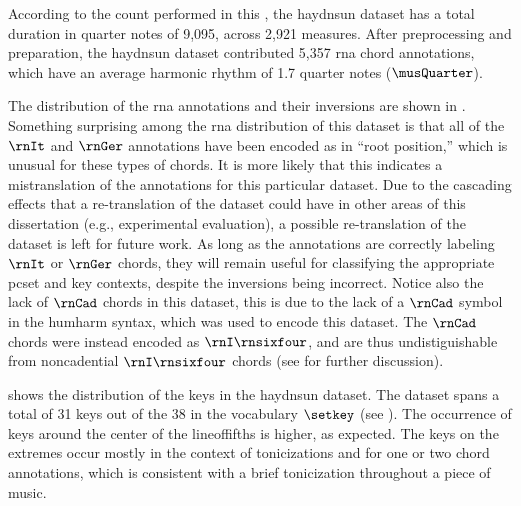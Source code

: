 
According to the count performed in this \thesisdiss{}, the
\gls{haydnsun} dataset has a total duration in quarter notes
of 9,095, across 2,921 measures. After preprocessing and
preparation, the \gls{haydnsun} dataset contributed 5,357
\gls{rna} chord annotations, which have an average harmonic
rhythm of 1.7 quarter notes ($\musQuarter$).

The distribution of the \gls{rna} annotations and their
inversions are shown in .
Something surprising among the \gls{rna} distribution of
this dataset is that all of the $\rnIt$ and $\rnGer$
annotations have been encoded as in ``root position,'' which
is unusual for these types of chords. It is more likely that
this indicates a mistranslation of the annotations for this
particular dataset. Due to the cascading effects that a
re-translation of the dataset could have in other areas of
this dissertation (e.g., experimental evaluation), a
possible re-translation of the dataset is left for future
work. As long as the annotations are correctly labeling
$\rnIt$ or $\rnGer$ chords, they will remain useful for
classifying the appropriate \gls{pcset} and key contexts,
despite the inversions being incorrect. Notice also the lack
of $\rnCad$ chords in this dataset, this is due to the lack
of a $\rnCad$ symbol in the \gls{humharm} syntax, which was
used to encode this dataset. The $\rnCad$ chords were
instead encoded as $\rnI\rnsixfour$, and are thus
undistiguishable from noncadential $\rnI\rnsixfour$ chords
(see  for
further discussion). 



 shows the distribution of the
keys in the \gls{haydnsun} dataset. The dataset spans a
total of 31 keys out of the 38 in the vocabulary $\setkey$
(see ). The occurrence of
keys around the center of the \gls{lineoffifths} is higher,
as expected. The keys on the extremes occur mostly in the
context of tonicizations and for one or two chord
annotations, which is consistent with a brief tonicization
throughout a piece of music.
